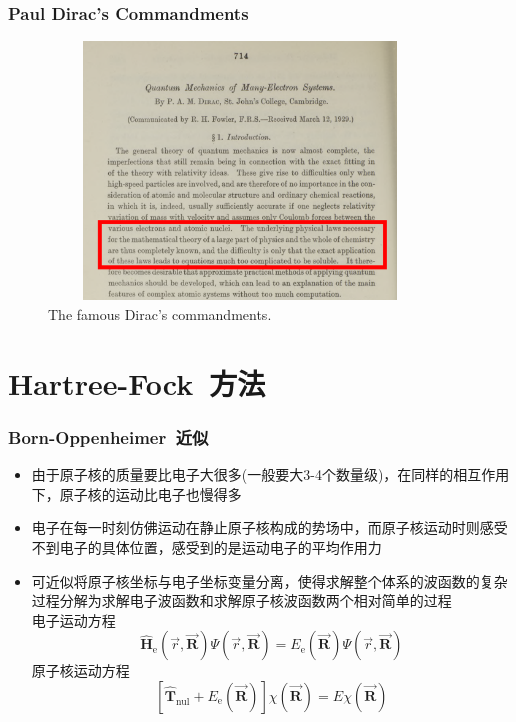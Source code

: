 \documentclass[cjk,slidestop,compress,mathserif,blue]{beamer}
\begin{document}
\frame
{
	\frametitle{\rm{Paul Dirac's Commandments}}
\begin{figure}[h!]
\centering
\vspace{-10.5pt}
\includegraphics[height=2.7in,width=4.0in,viewport=0 0 1200 890,clip]{Figures/Dirac_comment.png}
\caption{\tiny \textrm{The famous Dirac's commandments.}}%
\label{Dirac_Command}
\end{figure}
}

\section{\rm{Hartree-Fock~}方法}
\frame
{
	\frametitle{\textrm{Born-Oppenheimer~}近似}
	\begin{itemize}
		\item 由于原子核的质量要比电子大很多(一般要大3-4个数量级)，在同样的相互作用下，原子核的运动比电子也慢得多
		\item 电子在每一时刻仿佛运动在静止原子核构成的势场中，而原子核运动时则感受不到电子的具体位置，感受到的是运动电子的平均作用力
		\item 可近似将原子核坐标与电子坐标变量分离，使得求解整个体系的波函数的复杂过程分解为求解电子波函数和求解原子核波函数两个相对简单的过程\\
			电子运动方程$$\hat{\mathbf H}_{\mathrm e}(\vec r,\vec{\mathbf R})\Psi(\vec r,\vec{\mathbf R})=E_{\mathrm e}(\vec{\mathbf R})\Psi(\vec r,\vec{\mathbf R})$$
			原子核运动方程$$[\hat{\mathbf T}_{\mathrm{nul}}+E_{\mathrm e}(\vec{\mathbf R})]\chi(\vec{\mathbf R})=E\chi(\vec{\mathbf R})$$
	\end{itemize}
}
\end{document}
